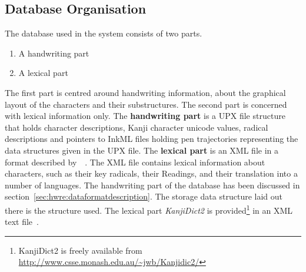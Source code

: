 



\subsection{Database Organisation}
\label{sec:hwre:databaseorganisation}

The database used in the system consists of two parts. 
\begin{enumerate}
\item A handwriting part
\item A lexical part
\end{enumerate}
The first part is centred around handwriting information, 
about the graphical layout of the characters and their substructures.
The second part is concerned with lexical information only.
The \textbf{handwriting part} is a UPX file structure that holds character 
descriptions, Kanji character unicode values, radical descriptions 
and pointers to InkML files holding pen trajectories representing the
data structures given in the UPX file.
The \textbf{lexical part} is an XML file in a format described 
by~~\citeyear{Breen2004}. The XML file contains 
lexical information about characters, such as their key radicals, their Readings,
and their translation into a number of languages.
The handwriting part of the database has been discussed in 
section~\ref{sec:hwre:dataformatdescription}. The storage data structure laid
out there is the structure used.
The lexical part \emph{KanjiDict2} is 
provided\footnote{KanjiDict2 is freely available from \url{http://www.csse.monash.edu.au/~jwb/Kanjidic2/}} in an XML text file~.

